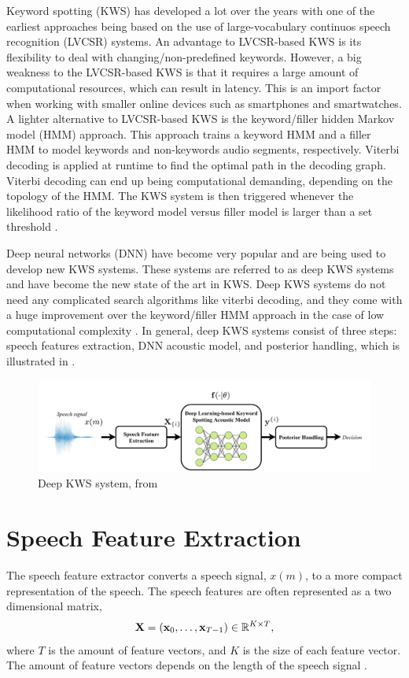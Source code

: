 Keyword spotting (KWS) has developed a lot over the years with one of the earliest approaches being based on the use of large-vocabulary continuos speech recognition (LVCSR) systems. An advantage to LVCSR-based KWS is its flexibility to deal with changing/non-predefined keywords. However, a big weakness to the LVCSR-based KWS is that it requires a large amount of computational resources, which can result in latency. This is an import factor when working with smaller online devices such as smartphones and smartwatches. A lighter alternative to LVCSR-based KWS is the keyword/filler hidden Markov model (HMM) approach. This approach trains a keyword HMM and a filler HMM to model keywords and non-keywords audio segments, respectively. Viterbi decoding is applied at runtime to find the optimal path in the decoding graph. Viterbi decoding can end up being computational demanding, depending on the topology of the HMM. The KWS system is then triggered whenever the likelihood ratio of the keyword model versus filler model is larger than a set threshold \cite{lopez2021deep}. 

Deep neural networks (DNN) have become very popular and are being used to develop new KWS systems. These systems are referred to as deep KWS systems and have become the new state of the art in KWS. Deep KWS systems do not need any complicated search algorithms like viterbi decoding, and they come with a huge improvement over the keyword/filler HMM approach in the case of low computational complexity \cite{lopez2021deep}. In general, deep KWS systems consist of three steps: speech features extraction, DNN acoustic model, and posterior handling, which is illustrated in .

\begin{figure}[ht]
    \centering
    \includegraphics[width=\textwidth]{incl/img/kws/deep_kws_system.png}
    \caption{ Deep KWS system, from \cite{lopez2021deep}}
    \label{fig:deep_kws_system}
\end{figure}

\section{Speech Feature Extraction}
The speech feature extractor converts a speech signal, \(x(m)\), to a more compact representation of the speech. The speech features are often represented as a two dimensional matrix,
\begin{align}
    \textbf{X} = (\textbf{x}_0, \dots, \textbf{x}_{T-1}) \in \mathbb{R}^{K\times T},
\end{align}
where \(T\) is the amount of feature vectors, and \(K\) is the size of each feature vector. The amount of feature vectors depends on the length of the speech signal \cite{lopez2021deep}. 

